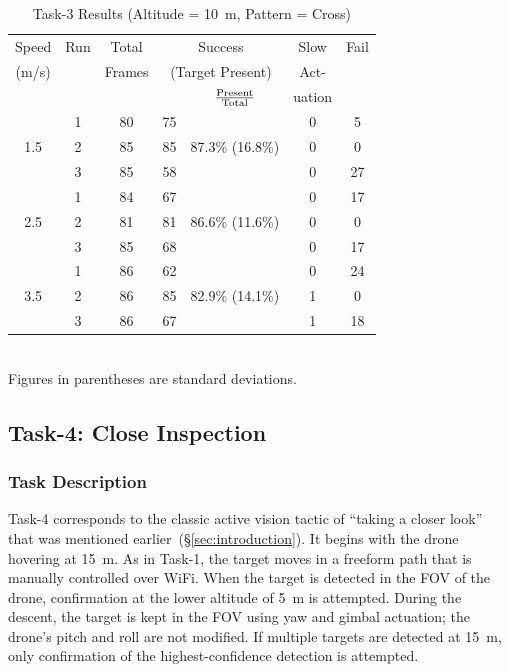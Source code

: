 \begin{table}
	\centering\small
	\begin{tabular}{|c|c|c|c|c|c|c|}
		\hline
		Speed & Run & Total & \multicolumn{2}{c|}{Success} & Slow & Fail\\
		(m/s) &  & Frames  & \multicolumn{2}{c|}{\footnotesize (Target Present)}& Act-  &  \\
		\cline{5-5} 
		&  &         &         & $\rm \frac{Present}{Total}$ & uation  & \\ 
		\hline
		& 1 & 80 & 75 &    & 0 & 5 \\
		1.5 & 2 & 85 & 85 & 87.3\% \scriptsize{(16.8\%)} & 0 & 0 \\
		& 3 & 85 & 58 &    & 0 & 27 \\
		\hline
		& 1 & 84 & 67 &        & 0 & 17 \\
		2.5 & 2 & 81 & 81 & 86.6\% \scriptsize{(11.6\%)} & 0 &  0 \\
		& 3 & 85 & 68 &        & 0 &  17 \\
		\hline
		& 1 & 86 & 62 &        & 0 &  24 \\
		3.5 & 2 & 86 & 85 & 82.9\% \scriptsize{(14.1\%)} & 1 & 0 \\
		& 3 & 86 & 67 &        & 1 &  18 \\
		\hline
	\end{tabular}
	\begin{captext}
		\centering \\[0.1cm] Figures in parentheses are standard deviations. \\
	\end{captext}
	\caption{Task-3 Results {\small (Altitude = 10~m, Pattern = Cross)}}
	\label{tab:task3-results-10m-cross}
\end{table}

\subsection{Task-4: Close Inspection}
\label{sec:task4}

\subsubsection{Task Description}
\label{sec:task4-desc}

Task-4 corresponds to the classic active vision tactic of ``taking a
closer look'' that was mentioned earlier~(\S\ref{sec:introduction}).   It
begins with the drone hovering at 15~m.  As in Task-1, the target
moves in a freeform path that is manually controlled over WiFi.  When
the target is detected in the FOV of the drone, confirmation at the
lower altitude of 5~m is attempted.  During the descent, the target is
kept in the FOV using yaw and gimbal actuation; the drone's
pitch and roll are not modified.  If multiple targets are detected at
15~m, only confirmation of the highest-confidence detection is
attempted.



